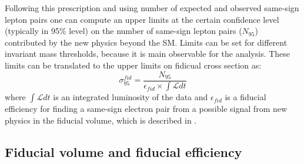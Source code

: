 Following this prescription and using number of expected and observed same-sign lepton pairs one can compute 
an upper limits at the certain confidence level (typically in 95$\%$ level) on the number of same-sign lepton pairs ($N_{95}$)
contributed by the new physics beyond the SM. Limits can be set for different invariant mass thresholds, because it is main observable for the analysis.
These limits can be translated to the upper limits on fidicual cross section as:
\begin{equation}
 \sigma_{95}^{fid} = \dfrac{N_{95}}{\epsilon_{fid} \times \int \mathscr{L} dt}
 \label{eq:fid_cross_section}
\end{equation}
where $\int \mathscr{L} dt$ is an integrated luminosity of the data and $\epsilon_{fid}$ is a fiducial efficiency for finding a same-sign electron pair from
a possible signal from new physics in the fiducial volume, which is described in .


\subsection{Fiducial volume and fiducial efficiency}
\label{subsec:fid_volume_eff}

